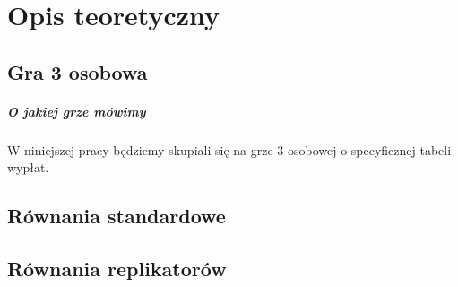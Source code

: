 \chapter{Opis teoretyczny}
\label{cha:opis_teor}

\section{Gra 3 osobowa}
\label{sec:3_gra}

\paragraph{O jakiej grze mówimy}
W niniejszej pracy będziemy skupiali się na grze 3-osobowej o specyficznej tabeli wypłat. 

\section{Równania standardowe}
\label{sec:r_stand}

\section{Równania replikatorów}
\label{sec:r_repli}